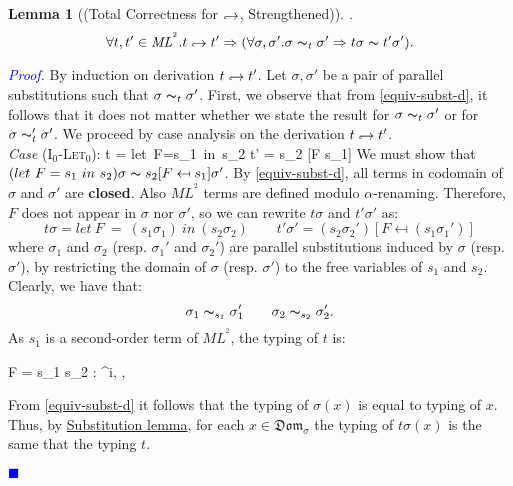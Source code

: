 \documentclass[a4paper,11pt,oneside]{article}
\theoremstyle{plain}
\newtheorem{lemma}[definition]{Lemma}
\renewenvironment{proof}{\noindent \begin{adjustwidth}{1.5em}{} \textcolor{blue}{\textit{Proof.}}}
{{\begin{tiny}\textcolor{blue}{$\blacksquare$}\end{tiny}}
\end{adjustwidth}~\\\noindent}
\newcommand{\tmlet}[3]{let~#1=#2~in~#3}
\newcommand{\tmsbst}[3]{#1 [#2 \mapsfrom #3] }
\newcommand{\bth}{\bot_\theta}
\newcommand{\brh}{\bot_\rho}
\newcommand{\inlsrc}{\textit{ML}^{^2}}
\newcommand{\hookdownarrow}{\mathrel{\rotatebox[origin=c]{180}{$\hookleftarrow$}}}
\newcommand{\ilarr}{\hookdownarrow}
\newcommand{\il}[2]{#1 \ilarr #2}
\begin{document}
\begin{lemma}[(Total Correctness for $\ilarr$, Strengthened)]
	\label{equiv-total-corr-p}.
   $$ \forall t,t' \in \inlsrc. \il{t}{t'} \Rightarrow (\forall \sigma, \sigma'. \sigma \thicksim_t \sigma' \Rightarrow t\sigma \thicksim t'\sigma').$$
  \end{lemma}
	\begin{proof}
	 By induction on derivation $\il{t}{t'}$. 
	 Let $\sigma, \sigma'$ be a pair of parallel substitutions such that $\sigma \thicksim_t \sigma'$.
	 First, we observe that from \cref{equiv-subst-d}, it follows that it does not matter whether we state the result for $\sigma \thicksim_t \sigma'$ or for $\sigma \thicksim_t' \sigma'$.
	 We proceed by case analysis on the derivation $\il{t}{t'}$.\\
	 
	\noindent\textit{Case} (\textsc{I}$_{0}$-\textsc{Let}$_0$):
	\vspace*{-1cm}
			{t = \tmlet{F}{s_1}{s_2} \hookdownarrow 				
			t' = \tmsbst{s_2}{F}{s_1}}
	 We must show that $(\tmlet{F}{s_1}{s_2})\sigma \thicksim \tmsbst{s_2}{F}{s_1}\sigma'$. 
By \cref{equiv-subst-d}, all terms in codomain of $\sigma$ and $\sigma'$ are \textbf{closed}. Also $\inlsrc$ terms are defined modulo $\alpha$-renaming. Therefore, $F$ does not appear in $\sigma$ nor $\sigma'$, so we can rewrite $t\sigma$ and $t'\sigma'$ as: 
	 $$ t\sigma = let~F~=~(s_1\sigma_1)~in~(s_2\sigma_2) \qquad
	 t'\sigma' = (s_2\sigma_2')[F \mapsfrom (s_1 \sigma_1')]$$ 	 
where $\sigma_1$ and $\sigma_2$ (resp. $\sigma_1'$ and $\sigma_2'$) are parallel substitutions induced by $\sigma$ (resp. $\sigma'$), by restricting the domain of $\sigma$ (resp. $\sigma'$) to the free variables of $s_1$ and $s_2$.
%
	Clearly, we have that:
$$ \sigma_1 \thicksim_{s_1} \sigma_1' \qquad \sigma_2 \thicksim_{s_2} \sigma_2'.$$
	As $s_1$ is a second-order term of $\inlsrc$, the typing of $t$ is:
		\begin{footnotesize}
		\infrule[] 
			{\vdash s_1 : \tau^2, \bth, \brh
			\qquad \vdash s_2 : \tau^i, \theta, \rho \quad (i \in \{0,1\})} 
			{\vdash {} F = s_1  s_2 
				: \tau^{i}, 
				\theta, 
				\rho}
	\end{footnotesize} 
	 
	From \cref{equiv-subst-d} it follows that the typing of $\sigma(x)$ is equal to typing of $x$.
	Thus, by \hyperlink{subst-lemma}{Substitution lemma}, for each $x \in \mathfrak{Dom}_\sigma$ the typing of $t\sigma(x)$ is the same that the typing $t$. 


\end{proof}
\end{document}
